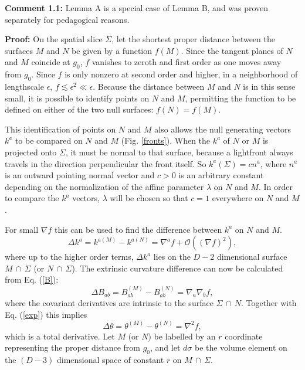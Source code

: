 \documentclass{article}
\begin{document}
\textbf{Comment 1.1:} Lemma A is a special case of Lemma B, and was proven separately for pedagogical reasons.

\textbf{Proof:} On the spatial slice $\Sigma$, let the shortest proper distance between the surfaces $M$ and $N$ be given by a function $f(M)$.  Since the tangent planes of $N$ and $M$ coincide at $g_0$, $f$ vanishes to zeroth and first order as one moves away from $g_0$.  Since $f$ is only nonzero at second order and higher, in a neighborhood of lengthscale $\epsilon$, $f \apprle \epsilon^2 \ll \epsilon$.  Because the distance between $M$ and $N$ is in this sense small, it is possible to identify points on $N$ and $M$, permitting the function to be defined on either of the two null surfaces: $f(N) = f(M)$.

This identification of points on $N$ and $M$ also allows the null generating vectors $k^a$ to be compared on $N$ and $M$ (Fig. \ref{fronts}).  When the $k^a$ of $N$ or $M$ is projected onto $\Sigma$, it must be normal to that surface, because a lightfront always travels in the direction perpendicular the front itself.  So $k^a(\Sigma) = c n^a$, where $n^a$ is an outward pointing normal vector and $c > 0$ is an arbitrary constant depending on the normalization of the affine parameter $\lambda$ on $N$ and $M$.  In order to compare the $k^a$ vectors, $\lambda$ will be chosen so that $c = 1$ everywhere on $N$ and $M$.

For small $\nabla f$ this can be used to find the difference between $k^a$ on $N$ and $M$.
\begin{equation}
\Delta k^a = k^{a(M)} - k^{a(N)} = \nabla^a f + \mathcal{O}((\nabla f)^2),
\end{equation}
where up to the higher order terms, $\Delta k^a$ lies on the $D-2$ dimensional surface $M\,\cap\,\Sigma$ (or $N\,\cap\, \Sigma$).  The extrinsic curvature difference can now be calculated from Eq. (\ref{B}):
\begin{equation}
\Delta B_{ab} = B_{ab}^{(M)} - B_{ab}^{(N)} = \nabla_a \nabla_b f,
\end{equation}
where the covariant derivatives are intrinsic to the surface $\Sigma\,\cap\,N$.  Together with Eq. (\ref{exp}) this implies
\begin{equation}
\Delta \theta = \theta^{(M)} - \theta^{(N)} = \nabla^2 f,
\end{equation}
which is a total derivative.  Let $M$ (or $N$) be labelled by an $r$ coordinate representing the proper distance from $g_0$, and let $d\sigma$ be the volume element on the $(D - 3)$ dimensional space of constant $r$ on $M\,\cap\,\Sigma$.  
\end{document}
